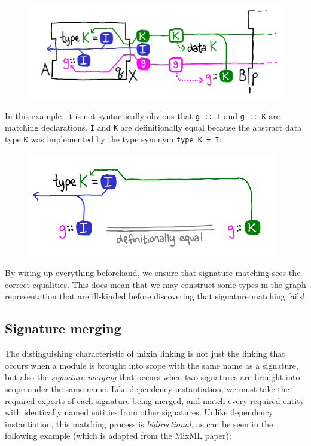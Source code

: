 \begin{figure}[H]
\center\includegraphics{figures/instantiation-with-synonyms.pdf}
\end{figure}

\noindent
In this example, it is not syntactically obvious that \verb|g :: I|
and \verb|g :: K| are matching declarations.  \verb|I|
and \verb|K| are definitionally equal because the abstract data type \verb|K|
was implemented by the type synonym \verb|type K = I|:

\begin{figure}[H]
\center\includegraphics{figures/instantiation-with-synonyms-reduced.pdf}
\end{figure}

\noindent
By wiring up everything beforehand, we ensure that signature matching
sees the correct equalities.  This does mean that we may construct some
types in the graph representation that are ill-kinded before discovering
that signature matching fails!

\subsection{Signature merging}
\label{sec:signature-merging}

The distinguishing characteristic of mixin
linking is not just the linking that occurs when a module is brought into
scope with the same name as a signature, but also the \emph{signature merging}
that occurs when two signatures are brought into scope under the same name.
Like dependency instantiation, we must take the required exports of each
signature being merged, and match every required entity with identically
named entities from other signatures.  Unlike dependency instantiation,
this matching process is \emph{bidirectional}, as can be seen in the following
example (which is adapted from the MixML paper):

